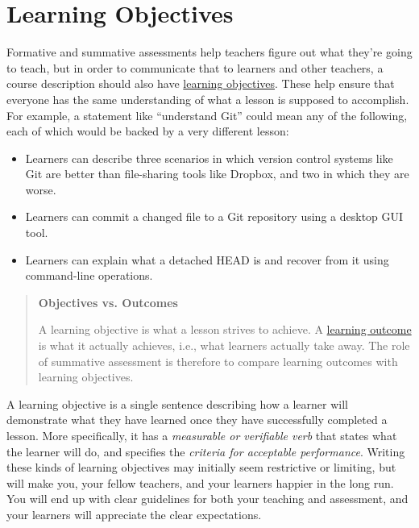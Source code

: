 \section{Learning Objectives}\label{s:process-objectives}

Formative and summative assessments help teachers figure out what
they're going to teach, but in order to communicate that to learners
and other teachers, a course description should also have \protect\hyperlink{g:learning-objective}{learning
objectives}. These help ensure that
everyone has the same understanding of what a lesson is supposed to
accomplish. For example, a statement like ``understand Git'' could mean
any of the following, each of which would be backed by a very
different lesson:

\begin{itemize}
\item
  Learners can describe three scenarios in which version control
  systems like Git are better than file-sharing tools like Dropbox,
  and two in which they are worse.
\item
  Learners can commit a changed file to a Git repository using a
  desktop GUI tool.
\item
  Learners can explain what a detached HEAD is and recover from it
  using command-line operations.
\end{itemize}

\begin{quote}\setlength{\parindent}{0pt}
\textbf{Objectives vs. Outcomes}

A learning objective is what a lesson strives to achieve. A
\protect\hyperlink{g:learning-outcome}{learning outcome} is what it actually
achieves, i.e., what learners actually take away. The role of
summative assessment is therefore to compare learning outcomes with
learning objectives.
\end{quote}

A learning objective is a single sentence describing how a learner
will demonstrate what they have learned once they have successfully
completed a lesson. More specifically, it has a \emph{measurable or
verifiable verb} that states what the learner will do, and specifies
the \emph{criteria for acceptable performance}. Writing these kinds of
learning objectives may initially seem restrictive or limiting, but
will make you, your fellow teachers, and your learners happier in the
long run. You will end up with clear guidelines for both your teaching
and assessment, and your learners will appreciate the clear
expectations.

